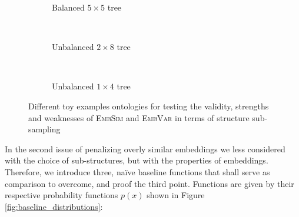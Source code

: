 \documentclass[]{article}
\begin{document}
\begin{figure}
	\centering
	\begin{subfigure}{1.\textwidth}
		\centering
		\caption{Balanced $5\times 5$ tree}
		\label{fig:tree_balanced}
	\end{subfigure}\\
	
	\begin{subfigure}{1.\textwidth}
		\centering
		\label{fig:tree_unbalanced}
		\caption{Unbalanced $2\times 8$ tree}
	\end{subfigure}	\\
	\begin{subfigure}{1.\textwidth}
		\centering
		\label{fig:tree_unbalanced_reduced}
		\caption{Unbalanced $1\times 4$ tree}
	\end{subfigure}	

	\caption{Different toy examples ontologies for testing the validity, strengths and weaknesses of \textsc{EmbSim} and \textsc{EmbVar} in terms of structure sub-sampling}
	\label{fig:trees}
\end{figure}


In the second issue of penalizing overly similar embeddings we less considered with the choice of sub-structures, but with the properties of embeddings. Therefore, we introduce three, na\"ive baseline functions that shall serve as comparison to overcome, and proof the third point. Functions are given by their respective probability functions $p(x)$ shown in Figure \ref{fig:baseline_distributions}:
\end{document}
